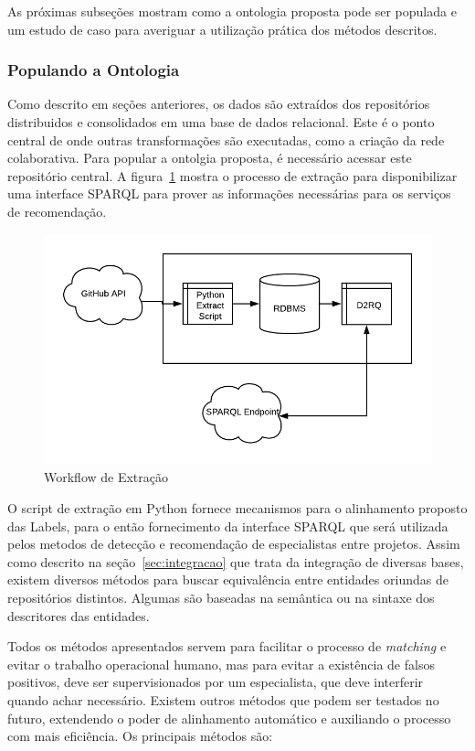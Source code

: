 \documentclass[sigconf]{acmart}
\begin{document}
As próximas subseções mostram como a ontologia proposta pode ser populada e um estudo de caso para averiguar a utilização prática dos métodos descritos.

\subsubsection{Populando a Ontologia}

Como descrito em seções anteriores, os dados são extraídos dos repositórios distribuidos e consolidados em uma base de dados relacional. Este é o ponto central de onde outras transformações são executadas, como a criação da rede colaborativa. Para popular a ontolgia proposta, é necessário acessar este repositório central. A figura~\ref{fig:workflow_ontologia} mostra o processo de extração para disponibilizar uma interface SPARQL para prover as informações necessárias para os serviços de recomendação.

\begin{figure}[!htbp]
 \centering
 \includegraphics[width=\columnwidth]{workflow_ontologia}
 \caption{Workflow de Extração}\label{fig:workflow_ontologia}
\end{figure}


O script de extração em Python fornece mecanismos para o alinhamento proposto das Labels, para o então fornecimento da interface SPARQL que será utilizada pelos metodos de detecção e recomendação de especialistas entre projetos. Assim como descrito na seção~\ref{sec:integracao} que trata da integração de diversas bases, existem diversos métodos para buscar equivalência entre entidades oriundas de repositórios distintos. Algumas são baseadas na semântica ou na sintaxe dos descritores das entidades.

Todos os métodos apresentados servem para facilitar o processo de \textit{matching} e evitar o trabalho operacional humano, mas para evitar a existência de falsos positivos, deve ser supervisionados por um especialista, que deve interferir quando achar necessário. Existem outros métodos que podem ser testados no futuro, extendendo o poder de alinhamento automático e auxiliando o processo com mais eficiência. Os principais métodos são:
\end{document}
